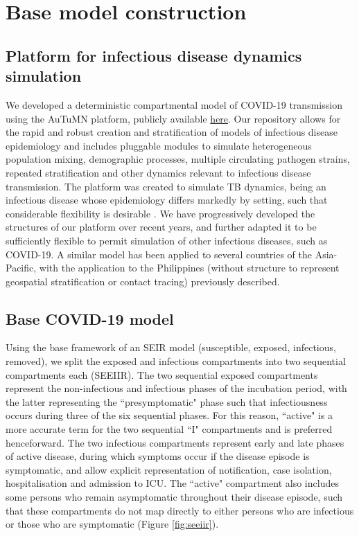 \section{Base model construction}
\subsection{Platform for infectious disease dynamics simulation}

We developed a deterministic compartmental model of COVID-19 transmission using the AuTuMN platform,
publicly available \href{https://github.com/monash-emu/AuTuMN/}{here}.
Our repository allows for the rapid and robust creation and stratification of models of infectious disease epidemiology and includes pluggable modules to simulate heterogeneous population mixing, demographic processes, multiple circulating pathogen strains, repeated stratification and other dynamics relevant to infectious disease transmission.
The platform was created to simulate TB dynamics, being an infectious disease whose epidemiology differs markedly by setting, such that considerable flexibility is desirable \cite{RN18}.
We have progressively developed the structures of our platform over recent years, and further adapted it to be sufficiently flexible to permit simulation of other infectious diseases, such as COVID-19. A similar model has been applied to several countries of the Asia-Pacific, with the application to the Philippines (without structure to represent geospatial stratification or contact tracing) previously described.\cite{RN79}

\subsection{Base COVID-19 model}
Using the base framework of an SEIR model (susceptible, exposed, infectious, removed), we split the exposed and infectious compartments into two sequential compartments each (SEEIIR). The two sequential exposed compartments represent the non-infectious and infectious phases of the incubation period, with the latter representing the ``presymptomatic" phase such that infectiousness occurs during three of the six sequential phases. For this reason, ``active" is a more accurate term for the two sequential ``I" compartments and is preferred henceforward. The two infectious compartments represent early and late phases of active disease, during which symptoms occur if the disease episode is symptomatic, and allow explicit representation of notification, case isolation, hospitalisation and admission to ICU. The ``active" compartment also includes some persons who remain asymptomatic throughout their disease episode, such that these compartments do not map directly to either persons who are infectious or those who are symptomatic (Figure \ref{fig:seeiir}).

